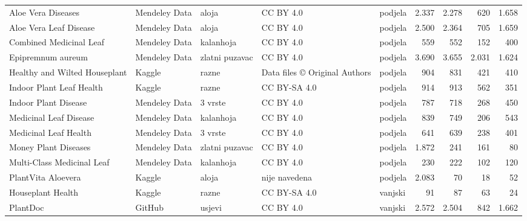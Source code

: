 \begin{tabular}{L{2.4cm} L{1.8cm} L{1.4cm} L{1.5cm} l r r r r}
\toprule
{}
 &  &  &  &  &  &  &  &  \\
\midrule
Aloe Vera Diseases \citep{skup_aloe_vera_diseases} & Mendeley Data & aloja & CC BY 4.0 & podjela & 2.337 & 2.278 & 620 & 1.658 \\
Aloe Vera Leaf Disease \citep{skup_aloe_vera_leaf_disease} & Mendeley Data & aloja & CC BY 4.0 & podjela & 2.500 & 2.364 & 705 & 1.659 \\
Combined Medicinal Leaf \citep{skup_combined_medicinal} & Mendeley Data & kalanhoja & CC BY 4.0 & podjela & 559 & 552 & 152 & 400 \\
Epipremnum aureum \citep{skup_epipremnum_aureum} & Mendeley Data & zlatni puzavac & CC BY 4.0 & podjela & 3.690 & 3.655 & 2.031 & 1.624 \\
Healthy and Wilted Houseplant \citep{skup_healthy_wilted} & Kaggle & razne & Data files © Original Authors & podjela & 904 & 831 & 421 & 410 \\
Indoor Plant Leaf Health \citep{skup_indoor_leaf_health} & Kaggle & razne & CC BY-SA 4.0 & podjela & 914 & 913 & 562 & 351 \\
Indoor Plant Disease \citep{skup_indoor_plant_disease} & Mendeley Data & 3 vrste & CC BY 4.0 & podjela & 787 & 718 & 268 & 450 \\
Medicinal Leaf Disease \citep{skup_medicinal_leaf_disease} & Mendeley Data & kalanhoja & CC BY 4.0 & podjela & 839 & 749 & 206 & 543 \\
Medicinal Leaf Health \citep{skup_medicinal_leaf_health} & Mendeley Data & 3 vrste & CC BY 4.0 & podjela & 641 & 639 & 238 & 401 \\
Money Plant Diseases \citep{skup_money_plant_atlas} & Mendeley Data & zlatni puzavac & CC BY 4.0 & podjela & 1.872 & 241 & 161 & 80 \\
Multi-Class Medicinal Leaf \citep{skup_multiclass_medicinal} & Mendeley Data & kalanhoja & CC BY 4.0 & podjela & 230 & 222 & 102 & 120 \\
PlantVita Aloevera \citep{skup_plantvita_aloevera} & Kaggle & aloja & nije navedena & podjela & 2.083 & 70 & 18 & 52 \\
Houseplant Health \citep{skup_houseplant_health} & Kaggle & razne & CC BY-SA 4.0 & vanjski & 91 & 87 & 63 & 24 \\
PlantDoc \citep{skup_plantdoc} & GitHub & usjevi & CC BY 4.0 & vanjski & 2.572 & 2.504 & 842 & 1.662 \\
\bottomrule
\end{tabular}
